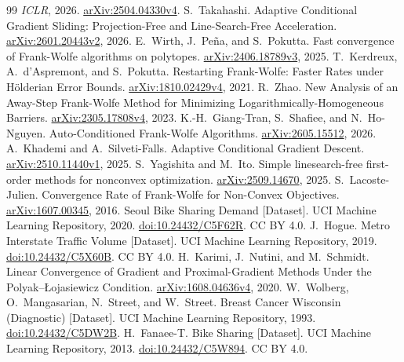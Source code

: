 \begin{thebibliography}{99}
\emph{ICLR}, 2026.
\href{https://arxiv.org/abs/2504.04330v4}{arXiv:2504.04330v4}.
 S.~Takahashi.
Adaptive Conditional Gradient Sliding: Projection-Free and Line-Search-Free Acceleration.
\href{https://arxiv.org/abs/2601.20443v2}{arXiv:2601.20443v2}, 2026.
 E.~Wirth, J.~Pe\~na, and S.~Pokutta.
Fast convergence of Frank-Wolfe algorithms on polytopes.
\href{https://arxiv.org/abs/2406.18789v3}{arXiv:2406.18789v3}, 2025.
 T.~Kerdreux, A.~d'Aspremont, and S.~Pokutta.
Restarting Frank-Wolfe: Faster Rates under H\"olderian Error Bounds.
\href{https://arxiv.org/abs/1810.02429v4}{arXiv:1810.02429v4}, 2021.
 R.~Zhao.
New Analysis of an Away-Step Frank-Wolfe Method for Minimizing
Logarithmically-Homogeneous Barriers.
\href{https://arxiv.org/html/2305.17808v4}{arXiv:2305.17808v4}, 2023.
 K.-H.~Giang-Tran, S.~Shafiee, and N.~Ho-Nguyen.
Auto-Conditioned Frank-Wolfe Algorithms.
\href{https://arxiv.org/abs/2605.15512}{arXiv:2605.15512}, 2026.
 A.~Khademi and A.~Silveti-Falls.
Adaptive Conditional Gradient Descent.
\href{https://arxiv.org/abs/2510.11440v1}{arXiv:2510.11440v1}, 2025.
 S.~Yagishita and M.~Ito.
Simple linesearch-free first-order methods for nonconvex optimization.
\href{https://arxiv.org/abs/2509.14670}{arXiv:2509.14670}, 2025.
 S.~Lacoste-Julien.
Convergence Rate of Frank-Wolfe for Non-Convex Objectives.
\href{https://arxiv.org/abs/1607.00345}{arXiv:1607.00345}, 2016.
 Seoul Bike Sharing Demand [Dataset].
UCI Machine Learning Repository, 2020.
\href{https://doi.org/10.24432/C5F62R}{doi:10.24432/C5F62R}. CC BY 4.0.
 J.~Hogue. Metro Interstate Traffic Volume [Dataset].
UCI Machine Learning Repository, 2019.
\href{https://doi.org/10.24432/C5X60B}{doi:10.24432/C5X60B}. CC BY 4.0.
 H.~Karimi, J.~Nutini, and M.~Schmidt.
Linear Convergence of Gradient and Proximal-Gradient Methods Under the
Polyak--{\L}ojasiewicz Condition.
\href{https://arxiv.org/abs/1608.04636v4}{arXiv:1608.04636v4}, 2020.
 W.~Wolberg, O.~Mangasarian, N.~Street, and W.~Street.
Breast Cancer Wisconsin (Diagnostic) [Dataset]. UCI Machine Learning Repository, 1993.
\href{https://doi.org/10.24432/C5DW2B}{doi:10.24432/C5DW2B}.
 H.~Fanaee-T. Bike Sharing [Dataset]. UCI Machine Learning Repository, 2013.
\href{https://doi.org/10.24432/C5W894}{doi:10.24432/C5W894}. CC BY 4.0.
\end{thebibliography}
